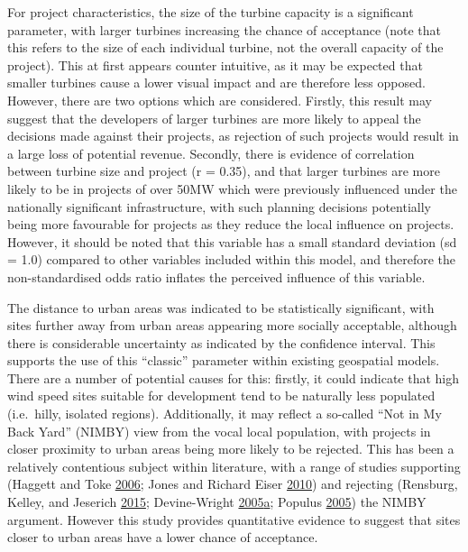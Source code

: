 \documentclass[a4paper,]{article}
\theoremstyle{definition}
\theoremstyle{definition}
\theoremstyle{definition}
\theoremstyle{remark}
\begin{document}
For project characteristics, the size of the turbine capacity is a
significant parameter, with larger turbines increasing the chance of
acceptance (note that this refers to the size of each individual
turbine, not the overall capacity of the project). This at first appears
counter intuitive, as it may be expected that smaller turbines cause a
lower visual impact and are therefore less opposed. However, there are
two options which are considered. Firstly, this result may suggest that
the developers of larger turbines are more likely to appeal the
decisions made against their projects, as rejection of such projects
would result in a large loss of potential revenue. Secondly, there is
evidence of correlation between turbine size and project (r = 0.35), and
that larger turbines are more likely to be in projects of over 50MW
which were previously influenced under the nationally significant
infrastructure, with such planning decisions potentially being more
favourable for projects as they reduce the local influence on projects.
However, it should be noted that this variable has a small standard
deviation (sd = 1.0) compared to other variables included within this
model, and therefore the non-standardised odds ratio inflates the
perceived influence of this variable.

The distance to urban areas was indicated to be statistically
significant, with sites further away from urban areas appearing more
socially acceptable, although there is considerable uncertainty as
indicated by the confidence interval. This supports the use of this
``classic'' parameter within existing geospatial models. There are a
number of potential causes for this: firstly, it could indicate that
high wind speed sites suitable for development tend to be naturally less
populated (i.e.~hilly, isolated regions). Additionally, it may reflect a
so-called ``Not in My Back Yard'' (NIMBY) view from the vocal local
population, with projects in closer proximity to urban areas being more
likely to be rejected. This has been a relatively contentious subject
within literature, with a range of studies supporting (Haggett and Toke
\protect\hyperlink{ref-Haggett2006}{2006}; Jones and Richard Eiser
\protect\hyperlink{ref-Jones2010}{2010}) and rejecting (Rensburg,
Kelley, and Jeserich \protect\hyperlink{ref-VanRensburg20}{2015};
Devine-Wright
\protect\hyperlink{ref-Devine-Wright2005a}{2005}\protect\hyperlink{ref-Devine-Wright2005a}{a};
Populus \protect\hyperlink{ref-Populus2005}{2005}) the NIMBY argument.
However this study provides quantitative evidence to suggest that sites
closer to urban areas have a lower chance of acceptance.
\end{document}
